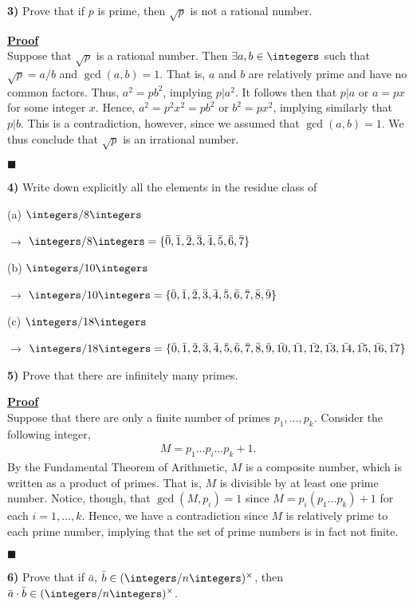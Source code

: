 \documentclass[12pt,a4paper]{article}
\newcommand{\prob}[2]{\textbf{#1)} #2}
\newenvironment{proof}
{
\textbf{\underline{Proof}} \\
}
{
\begin{flushright}
$\blacksquare$
\end{flushright}}
\begin{document}
\prob{3}{Prove that if $p$ is prime, then $\sqrt{p}$ is not a rational number.} 

\begin{proof}
Suppose that $\sqrt{p}$ is a rational number. Then $\exists a,b \in \integers$ such that $\sqrt{p} = a/b$ and $\gcd(a,b) = 1$. That is, $a$ and $b$ are relatively prime and have no common factors. Thus, $a^2 = pb^2$, implying $p|a^2$. It follows then that $p|a$ or $a = px$ for some integer $x$. Hence, $a^2 = p^2x^2 = pb^2$ or $b^2 = px^2$, implying similarly that $p|b$. This is a contradiction, however, since we assumed that $\gcd(a,b) = 1$. We thus conclude that $\sqrt{p}$ is an irrational number.
\end{proof}

\prob{4}{Write down explicitly all the elements in the residue class of}

(a) $\integers/8\integers$

$\rightarrow$ $\integers/8\integers = \{\bar{0},\bar{1},\bar{2},\bar{3},\bar{4},\bar{5},\bar{6},\bar{7}\}$

(b) $\integers/10\integers$

$\rightarrow$ $\integers/10\integers = \{\bar{0},\bar{1},\bar{2},\bar{3},\bar{4},\bar{5},\bar{6},\bar{7},\bar{8},\bar{9}\}$

(c) $\integers/18\integers$

$\rightarrow$ $\integers/18\integers = \{\bar{0},\bar{1},\bar{2},\bar{3},\bar{4},\bar{5},\bar{6},\bar{7},\bar{8},\bar{9},\bar{10},\bar{11},\bar{12},\bar{13},\bar{14},\bar{15},\bar{16},\bar{17}\}$

\prob{5}{Prove that there are infinitely many primes.}

\begin{proof}
Suppose that there are only a finite number of primes $p_1,\hdots,p_k$. Consider the following integer,
\begin{align*}
M = p_1\hdots p_i \hdots p_k + 1.
\end{align*}
By the Fundamental Theorem of Arithmetic, $M$ is a composite number, which is written as a product of primes. That is, $M$ is divisible by at least one prime number. Notice, though, that $\gcd(M,p_i) = 1$ since $M = p_i(p_1 \hdots p_k) + 1$ for each $i = 1,\hdots,k$. Hence, we have a contradiction since $M$ is relatively prime to each prime number, implying that the set of prime numbers is in fact not finite.
\end{proof}

\prob{6}{Prove that if $\bar{a}$, $\bar{b} \in (\integers/n\integers)^{\times}$, then $\bar{a} \cdot \bar{b} \in (\integers/n\integers)^{\times}$.}
\end{document}
